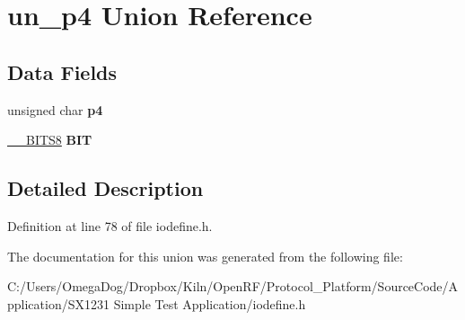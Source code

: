 \hypertarget{unionun__p4}{\section{un\-\_\-p4 Union Reference}
\label{unionun__p4}
}
\subsection*{Data Fields}
\begin{DoxyCompactItemize}
\item 
\hypertarget{unionun__p4_aa5a6861cfe7f751395a22884a9740116}{unsigned char {\bfseries p4}}\label{unionun__p4_aa5a6861cfe7f751395a22884a9740116}

\item 
\hypertarget{unionun__p4_aa1ce00c5073eceadc39bc4c80c454239}{\hyperlink{struct_____b_i_t_s8}{\-\_\-\-\_\-\-B\-I\-T\-S8} {\bfseries B\-I\-T}}\label{unionun__p4_aa1ce00c5073eceadc39bc4c80c454239}

\end{DoxyCompactItemize}


\subsection{Detailed Description}


Definition at line 78 of file iodefine.\-h.



The documentation for this union was generated from the following file\-:\begin{DoxyCompactItemize}
\item 
C\-:/\-Users/\-Omega\-Dog/\-Dropbox/\-Kiln/\-Open\-R\-F/\-Protocol\-\_\-\-Platform/\-Source\-Code/\-Application/\-S\-X1231 Simple Test Application/iodefine.\-h\end{DoxyCompactItemize}
